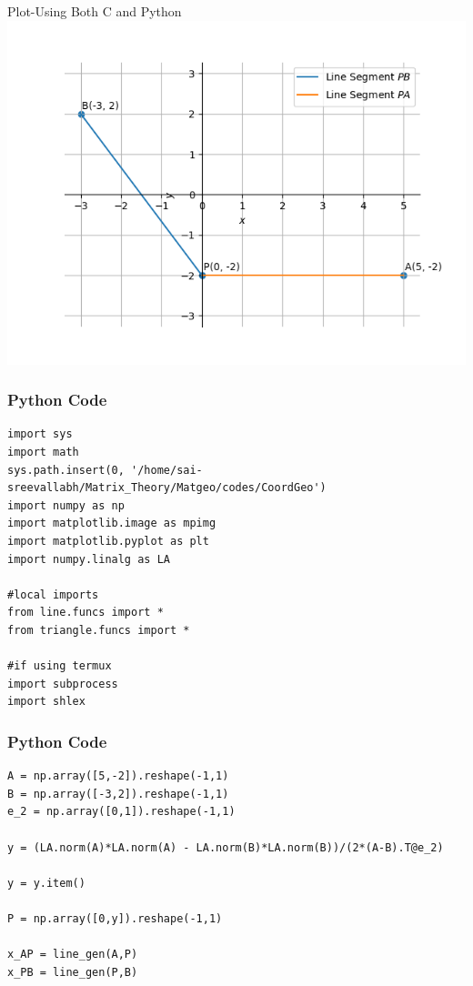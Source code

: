 \documentclass{beamer}
\begin{document}
\begin{frame}{Plot-Using Both C and Python}
    \centering
    \includegraphics[width=\columnwidth, height=0.8\textheight, keepaspectratio]{Figs/plot(py+C).png}     
\end{frame}



\begin{frame}[fragile]
    \frametitle{Python Code}
    \begin{lstlisting}
import sys
import math
sys.path.insert(0, '/home/sai-sreevallabh/Matrix_Theory/Matgeo/codes/CoordGeo')
import numpy as np
import matplotlib.image as mpimg
import matplotlib.pyplot as plt
import numpy.linalg as LA

#local imports
from line.funcs import *
from triangle.funcs import *

#if using termux
import subprocess
import shlex

\end{lstlisting}
\end{frame}

\begin{frame}[fragile]
    \frametitle{Python Code}
    \begin{lstlisting}
A = np.array([5,-2]).reshape(-1,1)
B = np.array([-3,2]).reshape(-1,1)
e_2 = np.array([0,1]).reshape(-1,1)

y = (LA.norm(A)*LA.norm(A) - LA.norm(B)*LA.norm(B))/(2*(A-B).T@e_2)

y = y.item()

P = np.array([0,y]).reshape(-1,1)

x_AP = line_gen(A,P)
x_PB = line_gen(P,B)

\end{lstlisting}
\end{frame}
\end{document}
